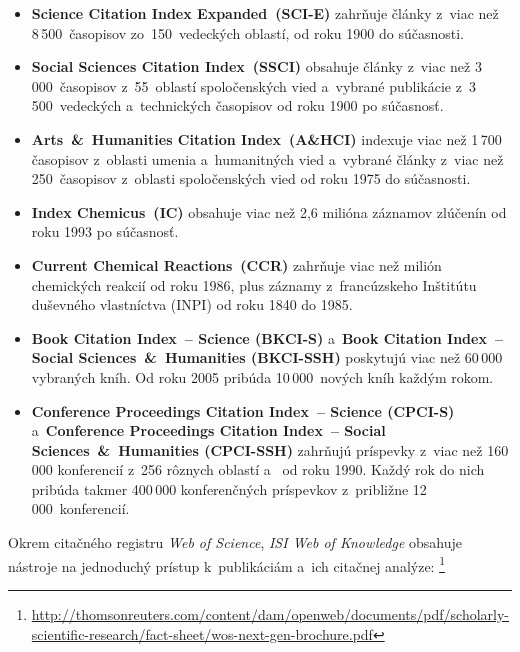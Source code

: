 \begin{itemize}
\item \textbf{Science Citation Index Expanded\R\ (SCI-E)} zahrňuje články
  z~viac než 8\,500~časopisov zo~150~vedeckých oblastí, od roku 1900 do
  súčasnosti.
\item \textbf{Social Sciences Citation Index\R\ (SSCI)} obsahuje články z~viac
  než 3\,000~časopisov z~55~oblastí spoločenských vied a~vybrané publikácie
  z~3\,500~vedeckých a~technických časopisov od roku 1900 po súčasnosť.
\item \textbf{Arts~\&~Humanities Citation Index\R\ (A\&HCI)} indexuje viac než
  1\,700 časopisov z~oblasti umenia a~humanitných vied a~vybrané články z~viac
  než 250~časopisov z~oblasti spoločenských vied od roku 1975 do súčasnosti.
\item \textbf{Index Chemicus\R\ (IC)} obsahuje viac než 2,6 milióna
  záznamov zlúčenín od roku 1993 po súčasnosť.
\item \textbf{Current Chemical Reactions\R\ (CCR)} zahrňuje viac než milión
  chemických reakcií od roku 1986, plus záznamy z~francúzskeho Inštitútu
  duševného vlastníctva (INPI) od roku 1840 do 1985.
\item \textbf{Book Citation Index\R\ -- Science (BKCI-S)} a~\textbf{Book
    Citation Index\R\ -- Social Sciences~\&~Humanities (BKCI-SSH)} poskytujú
  viac než 60\,000 vybraných kníh.  Od roku 2005 pribúda 10\,000~nových kníh
  každým rokom.
\item \textbf{Conference Proceedings Citation Index\R\ -- Science (CPCI-S)}
  a~\textbf{Conference Proceedings Citation Index\R\ -- Social
    Sciences~\&~Humanities (CPCI-SSH)} zahrňujú príspevky z~viac než 160\,000
  konferencií z~256 rôznych oblastí 
  a~ od roku 1990.  Každý rok do
  nich pribúda takmer 400\,000 konferenčných príspevkov z~približne
  12\,000~konferencií.
\end{itemize}

Okrem citačného registru \emph{Web of Science}, \emph{ISI Web of Knowledge}
obsahuje nástroje na jednoduchý prístup k~publikáciám a~ich citačnej analýze:%
\footnote{\url{http://thomsonreuters.com/content/dam/openweb/documents/pdf/scholarly-scientific-research/fact-sheet/wos-next-gen-brochure.pdf}}

